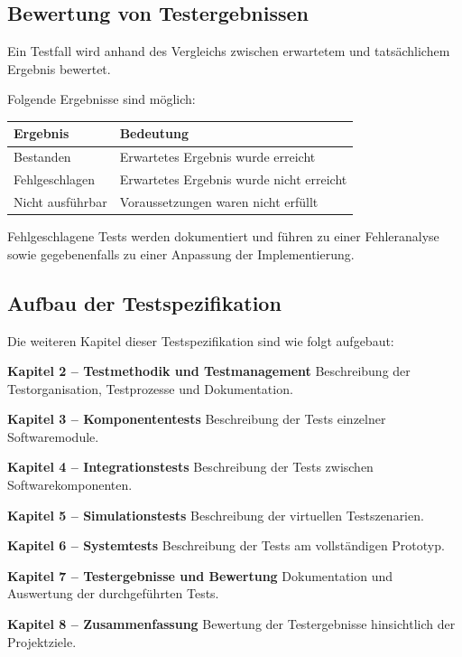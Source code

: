 \subsection{Bewertung von
Testergebnissen}\label{bewertung-von-testergebnissen}

Ein Testfall wird anhand des Vergleichs zwischen erwartetem und
tatsächlichem Ergebnis bewertet.

Folgende Ergebnisse sind möglich:

\begin{longtable}[]{@{}ll@{}}
\toprule\noalign{}
Ergebnis & Bedeutung \\
\midrule\noalign{}
\endhead
\bottomrule\noalign{}
\endlastfoot
Bestanden & Erwartetes Ergebnis wurde erreicht \\
Fehlgeschlagen & Erwartetes Ergebnis wurde nicht erreicht \\
Nicht ausführbar & Voraussetzungen waren nicht erfüllt \\
\end{longtable}

Fehlgeschlagene Tests werden dokumentiert und führen zu einer
Fehleranalyse sowie gegebenenfalls zu einer Anpassung der
Implementierung.

\subsection{Aufbau der
Testspezifikation}\label{aufbau-der-testspezifikation}

Die weiteren Kapitel dieser Testspezifikation sind wie folgt aufgebaut:

\textbf{Kapitel 2 -- Testmethodik und Testmanagement} Beschreibung der
Testorganisation, Testprozesse und Dokumentation.

\textbf{Kapitel 3 -- Komponententests} Beschreibung der Tests einzelner
Softwaremodule.

\textbf{Kapitel 4 -- Integrationstests} Beschreibung der Tests zwischen
Softwarekomponenten.

\textbf{Kapitel 5 -- Simulationstests} Beschreibung der virtuellen
Testszenarien.

\textbf{Kapitel 6 -- Systemtests} Beschreibung der Tests am
vollständigen Prototyp.

\textbf{Kapitel 7 -- Testergebnisse und Bewertung} Dokumentation und
Auswertung der durchgeführten Tests.

\textbf{Kapitel 8 -- Zusammenfassung} Bewertung der Testergebnisse
hinsichtlich der Projektziele.

